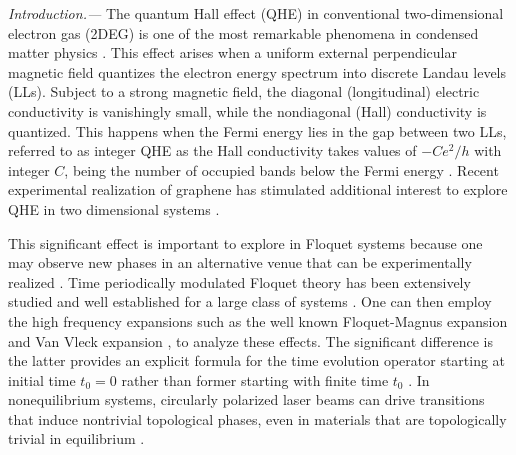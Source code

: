 \documentclass[aps,prb,twocolumn,showpacs,superscriptaddress]{revtex4-2}
\begin{document}
\maketitle

\emph{Introduction.---} The quantum Hall effect (QHE) in conventional two-dimensional electron gas (2DEG) is one of the most remarkable phenomena in condensed matter physics \cite{QHE1}.
This effect arises when a uniform external perpendicular magnetic field quantizes the electron energy spectrum into discrete Landau levels (LLs).
Subject to a strong magnetic field, the diagonal (longitudinal) electric conductivity is vanishingly small, while the nondiagonal (Hall) conductivity is quantized.
This happens when the Fermi energy lies in the gap between two LLs, referred to as integer QHE as the Hall conductivity takes values of $-Ce^2/h$ with integer $C$, being the number of occupied bands below the Fermi energy \cite{QHE4}.
Recent experimental realization of graphene has stimulated additional interest to explore QHE in two dimensional systems \cite{QHE2, QHE3, QHE4}.

This significant effect is important to explore in Floquet systems \cite{NHL, AEE} because one may observe new phases in an alternative venue that can be experimentally realized \cite{MCR, YHW, HZJ, JWM,merboldtObservationFloquetStates2024, choiDirectObservationFloquetBloch2025}.
Time periodically modulated Floquet theory has been extensively studied and well established for a large class of systems \cite{JHS,HSA,MGP,MBL,AEE,NGJ}.
One can then employ the high frequency expansions \cite{MBL,AEE,NGJ,SRI,API,TMS,ESM,TKT,ALA} such as the well known Floquet-Magnus expansion \cite{ESM,TKT,ALA,FCA} and Van Vleck expansion \cite{MBL,AEE}, to analyze these effects.
The significant difference is the latter provides an explicit formula for the time evolution operator starting at initial time $t_{0}=0$ rather than former starting with finite time $t_{0}$ \cite{supp}.
In nonequilibrium systems, circularly polarized laser beams can drive transitions that induce nontrivial topological phases, even in materials that are topologically trivial in equilibrium \cite{TKO}.
\end{document}
